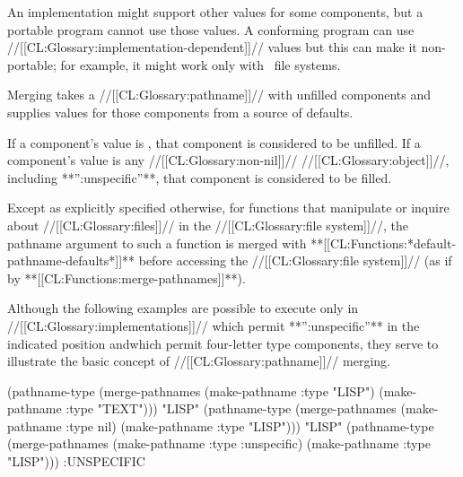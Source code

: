 \itemitem{\bull}
  An implementation might support other values for some components,
  but a portable program cannot use those values.
  A conforming program can use //[[CL:Glossary:implementation-dependent]]// values
  but this can make it non-portable;
  for example, it might work only with \Unix\ file systems.
\endlist                                   




\endsubsubsection%



\endSubsection%


Merging takes a //[[CL:Glossary:pathname]]// with unfilled components
and supplies values for those components from a source of defaults.

If a component's value is \nil, that component is considered to be unfilled.
If a component's value is any //[[CL:Glossary:non-nil]]// //[[CL:Glossary:object]]//, 
including **'':unspecific''**, that component is considered to be filled.








Except as explicitly specified otherwise,
for functions that manipulate or inquire about //[[CL:Glossary:files]]// in the //[[CL:Glossary:file system]]//,
the pathname argument to such a function
is merged with **[[CL:Functions:*default-pathname-defaults*]]** before accessing the //[[CL:Glossary:file system]]//
(as if by **[[CL:Functions:merge-pathnames]]**).


Although the following examples are possible to execute only in
//[[CL:Glossary:implementations]]// which permit **'':unspecific''** in the indicated
position andwhich permit four-letter type components, they serve to illustrate
the basic concept of //[[CL:Glossary:pathname]]// merging.

\medbreak
\code
 (pathname-type 
   (merge-pathnames (make-pathname :type "LISP")
                    (make-pathname :type "TEXT")))
\EV "LISP"
\smallbreak
 (pathname-type 
   (merge-pathnames (make-pathname :type nil)
                    (make-pathname :type "LISP")))
\EV "LISP"
\smallbreak
 (pathname-type 
   (merge-pathnames (make-pathname :type :unspecific)
                    (make-pathname :type "LISP")))
\EV :UNSPECIFIC
\endcode

\endsubsubsection%

\endsubSection%

